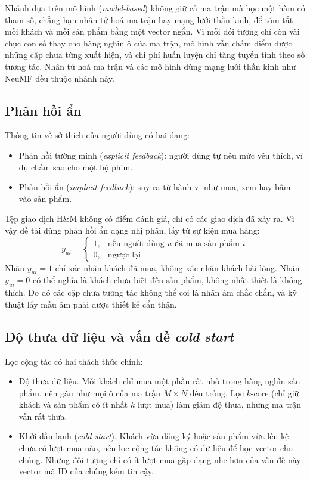 Nhánh dựa trên mô hình (\textit{model-based}) không giữ cả ma trận mà học một hàm có tham số, chẳng hạn nhân tử hoá ma trận hay mạng lưới thần kinh, để tóm tắt mỗi khách và mỗi sản phẩm bằng một vector ngắn. Vì mỗi đối tượng chỉ còn vài chục con số thay cho hàng nghìn ô của ma trận, mô hình vẫn chấm điểm được những cặp chưa từng xuất hiện, và chi phí huấn luyện chỉ tăng tuyến tính theo số tương tác. Nhân tử hoá ma trận và các mô hình dùng mạng lưới thần kinh như NeuMF đều thuộc nhánh này.

\subsection{Phản hồi ẩn}
\label{subsec:feedback_types}

Thông tin về sở thích của người dùng có hai dạng:
\begin{itemize}
    \item Phản hồi tường minh (\textit{explicit feedback}): người dùng tự nêu mức yêu thích, ví dụ chấm sao cho một bộ phim.
    \item Phản hồi ẩn (\textit{implicit feedback}): suy ra từ hành vi như mua, xem hay bấm vào sản phẩm.
\end{itemize}

Tệp giao dịch H\&M không có điểm đánh giá, chỉ có các giao dịch đã xảy ra. Vì vậy đề tài dùng phản hồi ẩn dạng nhị phân, lấy từ sự kiện mua hàng:
\begin{equation}
    y_{ui} = \begin{cases}
        1, & \text{nếu người dùng } u \text{ đã mua sản phẩm } i \\
        0, & \text{ngược lại}
    \end{cases}
    \label{eq:implicit_binary}
\end{equation}
Nhãn $y_{ui} = 1$ chỉ xác nhận khách đã mua, không xác nhận khách hài lòng. Nhãn $y_{ui} = 0$ có thể nghĩa là khách chưa biết đến sản phẩm, không nhất thiết là không thích. Do đó các cặp chưa tương tác không thể coi là nhãn âm chắc chắn, và kỹ thuật lấy mẫu âm phải được thiết kế cẩn thận.

\subsection{Độ thưa dữ liệu và vấn đề \textit{cold start}}
\label{subsec:thachthuc_sparsity}

Lọc cộng tác có hai thách thức chính:
\begin{itemize}
    \item Độ thưa dữ liệu. Mỗi khách chỉ mua một phần rất nhỏ trong hàng nghìn sản phẩm, nên gần như mọi ô của ma trận $M \times N$ đều trống. Lọc $k$-core (chỉ giữ khách và sản phẩm có ít nhất $k$ lượt mua) làm giảm độ thưa, nhưng ma trận vẫn rất thưa.
    \item Khởi đầu lạnh (\textit{cold start}). Khách vừa đăng ký hoặc sản phẩm vừa lên kệ chưa có lượt mua nào, nên lọc cộng tác không có dữ liệu để học vector cho chúng. Những đối tượng chỉ có ít lượt mua gặp dạng nhẹ hơn của vấn đề này: vector mã ID của chúng kém tin cậy.
\end{itemize}

